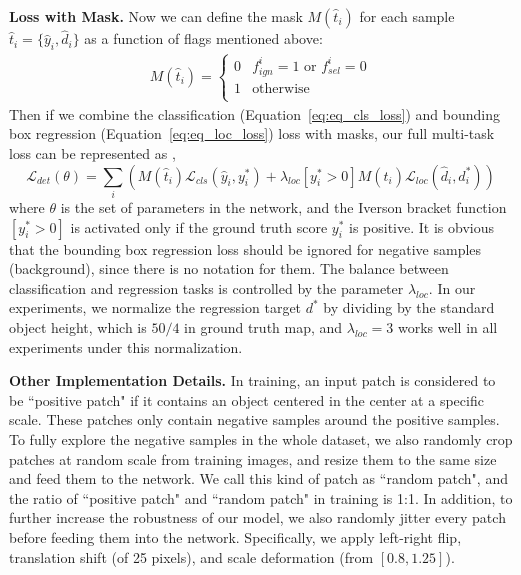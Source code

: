 \textbf{Loss with Mask.} 
Now we can define the mask $M(\hat{t}_i)$ for each sample $\hat{t}_i = \{ \hat{y}_i, \hat{d}_i \}$ as a function of flags mentioned above:
	\begin{eqnarray}\label{eq:eq_mask}
	M(\hat{t}_i) =
	\begin{cases}
	0 &  f_{ign}^{i} = 1 \text{ or } f_{sel}^{i} = 0 \\
	1 & \text{otherwise} \\
	\end{cases}
	\end{eqnarray}
 Then if we combine the classification (Equation~\ref{eq:eq_cls_loss})  and bounding box regression (Equation~\ref{eq:eq_loc_loss}) loss with masks, our full multi-task loss can be represented as ,
	\begin{equation}\label{eq:eq_det_loss}
	\mathcal{L} _{det}(\theta) =  \sum_{i}  \left ( M(\hat{t}_i) \mathcal{L} _{cls}(\hat{y}_i,y^*_i) + \lambda_{loc} [y^*_i >0]M(\hat{t}_i) \mathcal{L} _{loc}(\hat{d}_i,d^*_i) \right )
	\end{equation}
where $\theta$ is the set of parameters in the network, and the Iverson bracket function $[y^*_i >0]$ is activated only if the ground truth score $y^*_i$ is positive. It is obvious that the bounding box regression loss should be ignored for negative samples (background), since there is no notation for them. The balance between classification and regression tasks is controlled by the parameter $\lambda_{loc}$. In our experiments, we normalize the regression target $d^*$ by dividing by the standard object height, which is $50/4$ in ground truth map, and $\lambda_{loc} = 3$ works well in all experiments under this normalization. 

\textbf{Other Implementation Details.} 
In training, an input patch is considered to be ``positive patch" if it contains an object centered in the center at a specific scale.  These patches only contain negative samples around the positive samples.  To fully explore the negative samples in the whole dataset, we also randomly crop patches at random scale from training images, and resize them to the same size and feed them to the network. We call this kind of patch as ``random patch", and the ratio of ``positive patch" and ``random patch" in training is 1:1.  In addition, to further increase the robustness of our model, we also randomly jitter every patch before feeding them into the network.  Specifically, we apply left-right flip, translation shift (of 25 pixels), and scale deformation (from $[0.8 , 1.25]$). 

